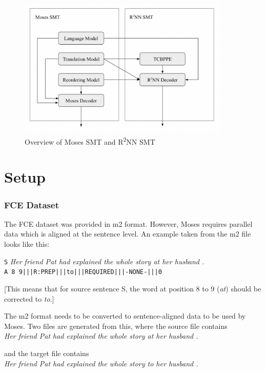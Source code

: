 \documentclass[12pt,a4paper,twoside,openright]{report}
\begin{document}
\begin{figure}[ht]
\centering
\includegraphics[width=0.9\textwidth]{images/overview_moses_r2nn.png}
\caption{Overview of Moses SMT and R\textsuperscript{2}NN SMT}
\label{fig:moses_r2nn}
\end{figure}

\section{Setup}\label{section:setup}

\subsubsection{FCE Dataset}

The FCE dataset was provided in m2 format. However, Moses requires parallel data which is aligned at the sentence level. An example taken from the m2 file looks like this:

\texttt{S} \textit{Her friend Pat had explained the whole story at her husband .}\\
\texttt{A 8 9|||R:PREP|||to|||REQUIRED|||-NONE-|||0}

[This means that for source sentence S, the word at position 8 to 9 (\textit{at}) should be corrected to \textit{to}.]

The m2 format needs to be converted to sentence-aligned data to be used by Moses. Two files are generated from this, where the source file contains\\
\textit{Her friend Pat had explained the whole story at her husband .}

and the target file contains\\
\textit{Her friend Pat had explained the whole story to her husband .}
\end{document}
